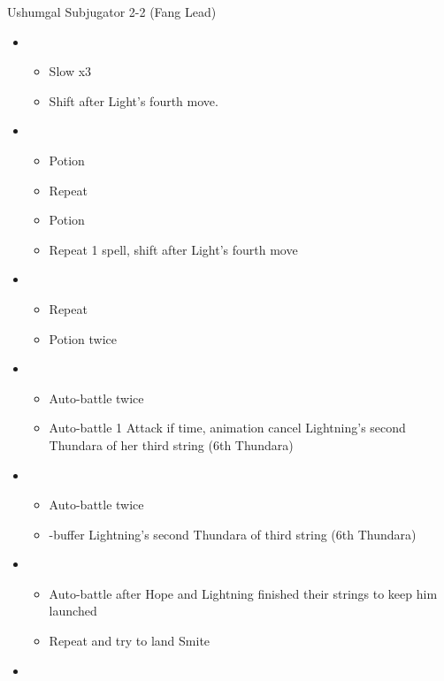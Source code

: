 	\begin{battle}[2:25]{Ushumgal Subjugator 2-2 (Fang Lead)}
		\begin{itemize}
			\item \third
			      \begin{itemize}
				      \item Slow x3
				      \item Shift after Light's fourth move.
			      \end{itemize}
			\item \fifth
			      \begin{itemize}
				      \item Potion
				      \item Repeat
				      \item Potion
				      \item Repeat 1 spell, shift after Light's fourth move
			      \end{itemize}
			\item \third
			      \begin{itemize}
				      \item Repeat
				      \item Potion twice
			      \end{itemize}
			\item \second
			      \begin{itemize}
				      \item Auto-battle twice
				      \item Auto-battle 1 Attack if time, animation cancel Lightning's second Thundara of her third string (6th Thundara)
			      \end{itemize}
			\item \sixth
			      \begin{itemize}
				      \item Auto-battle twice
				      \item \com-buffer Lightning's second Thundara of third string (6th Thundara)
			      \end{itemize}
			\item \first
			      \begin{itemize}
				      \item Auto-battle after Hope and Lightning finished their strings to keep him launched
				      \item Repeat and try to land Smite
			      \end{itemize}
			\item \third
			      \begin{itemize}

\end{itemize}
\end{itemize}
\end{battle}
